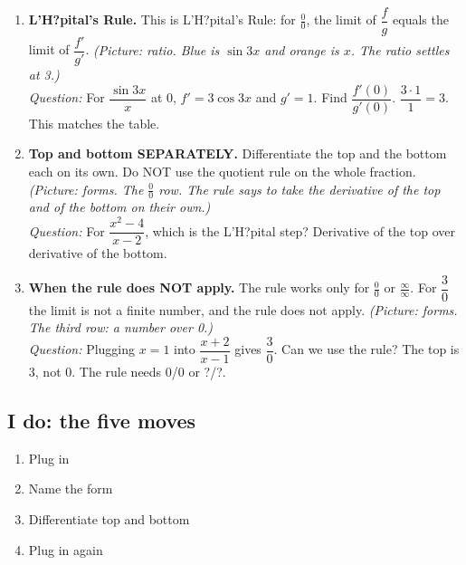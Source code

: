 \documentclass[11pt]{article}
\begin{document}
\begin{enumerate}
\item \textbf{L'H?pital's Rule.} This is L'H?pital's Rule: for $\frac00$, the limit of $\dfrac fg$ equals the limit of $\dfrac{f'}{g'}$. \textit{(Picture: ratio. Blue is $\sin 3x$ and orange is $x$. The ratio settles at 3.)}\\ \textit{Question:} For $\dfrac{\sin3x}{x}$ at 0, $f'=3\cos3x$ and $g'=1$. Find $\dfrac{f'(0)}{g'(0)}$.  $\dfrac{3\cdot1}{1}=3$. This matches the table.
\item \textbf{Top and bottom SEPARATELY.} Differentiate the top and the bottom each on its own. Do NOT use the quotient rule on the whole fraction. \textit{(Picture: forms. The $\frac00$ row. The rule says to take the derivative of the top and of the bottom on their own.)}\\ \textit{Question:} For $\dfrac{x^2-4}{x-2}$, which is the L'H?pital step?  Derivative of the top over derivative of the bottom.
\item \textbf{When the rule does NOT apply.} The rule works only for $\frac00$ or $\frac{\infty}{\infty}$. For $\dfrac30$ the limit is not a finite number, and the rule does not apply. \textit{(Picture: forms. The third row: a number over 0.)}\\ \textit{Question:} Plugging $x=1$ into $\dfrac{x+2}{x-1}$ gives $\dfrac30$. Can we use the rule?  The top is 3, not 0. The rule needs 0/0 or ?/?.
\end{enumerate}
\subsection*{I do: the five moves}\begin{enumerate}\item Plug in
\item Name the form
\item Differentiate top and bottom
\item Plug in again\end{enumerate}
\end{document}
